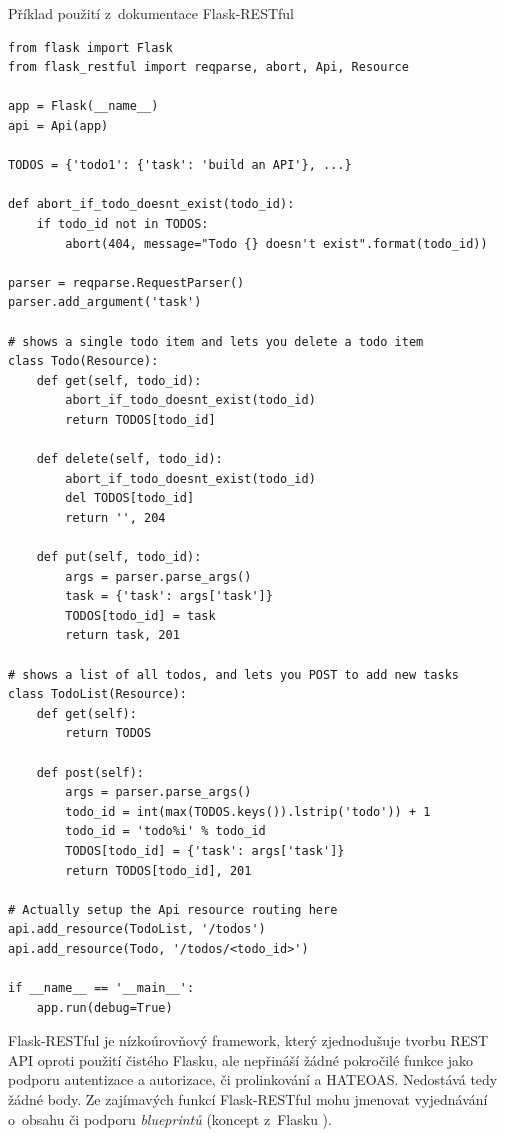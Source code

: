 \begin{listing}[htbp]
\caption{{\label{code:flaskresful}Příklad použití z~dokumentace Flask-RESTful \autocite{flaskrestfuldoc}}}
\begin{verbatim}
from flask import Flask
from flask_restful import reqparse, abort, Api, Resource

app = Flask(__name__)
api = Api(app)

TODOS = {'todo1': {'task': 'build an API'}, ...}

def abort_if_todo_doesnt_exist(todo_id):
    if todo_id not in TODOS:
        abort(404, message="Todo {} doesn't exist".format(todo_id))

parser = reqparse.RequestParser()
parser.add_argument('task')

# shows a single todo item and lets you delete a todo item
class Todo(Resource):
    def get(self, todo_id):
        abort_if_todo_doesnt_exist(todo_id)
        return TODOS[todo_id]

    def delete(self, todo_id):
        abort_if_todo_doesnt_exist(todo_id)
        del TODOS[todo_id]
        return '', 204

    def put(self, todo_id):
        args = parser.parse_args()
        task = {'task': args['task']}
        TODOS[todo_id] = task
        return task, 201

# shows a list of all todos, and lets you POST to add new tasks
class TodoList(Resource):
    def get(self):
        return TODOS

    def post(self):
        args = parser.parse_args()
        todo_id = int(max(TODOS.keys()).lstrip('todo')) + 1
        todo_id = 'todo%i' % todo_id
        TODOS[todo_id] = {'task': args['task']}
        return TODOS[todo_id], 201

# Actually setup the Api resource routing here
api.add_resource(TodoList, '/todos')
api.add_resource(Todo, '/todos/<todo_id>')

if __name__ == '__main__':
    app.run(debug=True)
\end{verbatim}
\end{listing}

Flask-RESTful je nízkoúrovňový framework, který zjednodušuje tvorbu REST API oproti použití čistého Flasku, ale nepřináší žádné pokročilé funkce jako podporu autentizace a autorizace, či prolinkování a HATEOAS. Nedostává tedy žádné body. Ze zajímavých funkcí Flask-RESTful mohu jmenovat vyjednávání o~obsahu či podporu \emph{blueprintů} (koncept z~Flasku \autocite{blueprint}).
